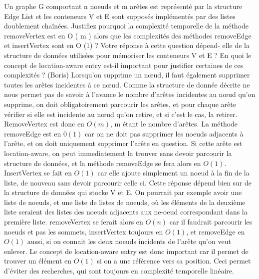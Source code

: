  Un graphe
G
comportant
n
noeuds et
m
arêtes est représenté par la structure
Edge List
et les conteneurs
V
et
E
sont supposés implémentés par des listes
doublement chaînées. Justifiez pourquoi la complexité temporelle de la méthode
removeVertex
est en
O
(
m
)
alors que les complexités des méthodes
removeEdge
et
insertVertex
sont en
O
(1)
? Votre réponse à cette question dépend-
elle de la structure de données utilisées pour mémoriser les conteneurs
V
et
E
?
En quoi le concept de
location-aware entry
est-il important pour justifier certaines
de ces complexités ?
(Boris)
Lorsqu'on supprime un nœud, il faut également supprimer toutes les arêtes incidentes à ce nœud. Comme la structure de donnée décrite ne nous permet pas de savoir à l'avance le nombre d'arêtes incidentes au nœud qu'on supprime, on doit obligatoirement parcourir les arêtes, et pour chaque arête vérifier si elle est incidente au nœud qu'on retire, et si c'est le cas, la retirer. RemoveVertex est donc en $O(m)$, m étant le nombre d'arêtes. La méthode removeEdge est en $0(1)$ car on ne doit pas supprimer les noeuds adjacents à l'arête, et on doit uniquement supprimer l'arête en question. Si cette arête est location-aware, on peut immediatement la trouver sans devoir parcourir la structure de données, et la méthode removeEdge se fera alors en $O(1)$. InsertVertex se fait en $O(1)$ car elle ajoute simplement un noeud à la fin de la liste, de nouveau sans devoir parcourir celle ci. Cette réponse dépend bien sur de la structure de données qui stocke V et E. On pourrait par exemple avoir une liste de noeuds, et une liste de listes de noeuds, où les éléments de la deuxième liste seraient des listes des noeuds adjacents aux ne-oeud correspondant dans la première liste. removeVertex se ferait alors en $O(n)$ car il faudrait parcourir les noeuds et pas les sommets, insertVertex toujours en $O(1)$, et removeEdge en $O(1)$ aussi, si on connait les deux noeuds incidents de l'arête qu'on veut enlever. Le concept de location-aware entry est donc important car il permet de trouver un élément en $O(1)$ si on a une référence vers sa position. Ceci permet d'éviter des recherches, qui sont toujours en complexité temporelle linéaire.